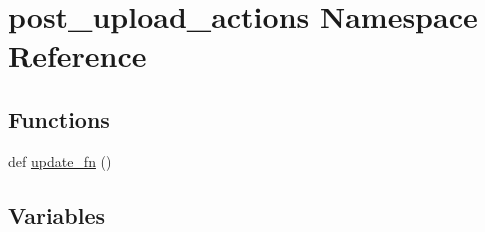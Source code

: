 \hypertarget{namespacepost__upload__actions}{}\section{post\+\_\+upload\+\_\+actions Namespace Reference}
\label{namespacepost__upload__actions}
\subsection*{Functions}
\begin{DoxyCompactItemize}
\item 
def \hyperlink{namespacepost__upload__actions_ae4fafb438c9b8b9c81fadfd36e414dbe}{update\+\_\+fn} ()
\end{DoxyCompactItemize}
\subsection*{Variables}
